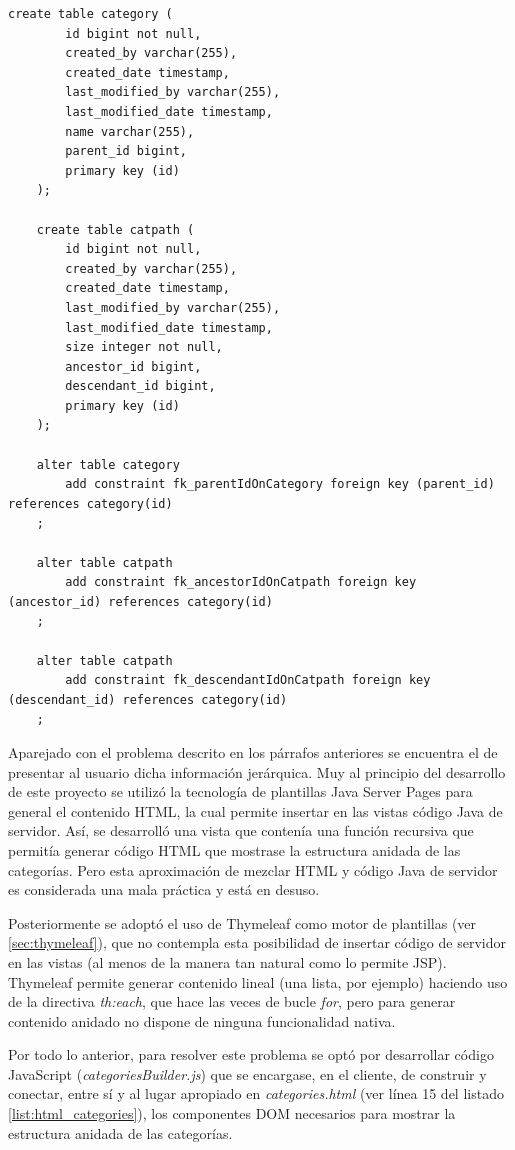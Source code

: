 \documentclass[a4paper]{article}
\begin{document}
    \begin{lstlisting}[caption=Tablas que gestionan las categorías,label=list:sql_cat]
    create table category (
    	id bigint not null, 
    	created_by varchar(255), 
    	created_date timestamp, 
    	last_modified_by varchar(255), 
    	last_modified_date timestamp, 
    	name varchar(255), 
    	parent_id bigint, 
    	primary key (id)
    );
    	
    create table catpath (
    	id bigint not null, 
    	created_by varchar(255), 
    	created_date timestamp, 
    	last_modified_by varchar(255), 
    	last_modified_date timestamp, 
    	size integer not null, 
    	ancestor_id bigint, 
    	descendant_id bigint, 
    	primary key (id)
    );
    
    alter table category 
    	add constraint fk_parentIdOnCategory foreign key (parent_id) references category(id)
    ;
    
    alter table catpath 
    	add constraint fk_ancestorIdOnCatpath foreign key (ancestor_id) references category(id)
    ;
    
    alter table catpath 
    	add constraint fk_descendantIdOnCatpath foreign key (descendant_id) references category(id)
    ;
    \end{lstlisting}
    
    Aparejado con el problema descrito en los párrafos anteriores se encuentra el de presentar al usuario dicha información jerárquica. Muy al principio del desarrollo de este proyecto se utilizó la tecnología de plantillas Java Server Pages para general el contenido HTML, la cual permite insertar en las vistas código Java de servidor. Así, se desarrolló una vista que contenía una función recursiva que permitía generar código HTML que mostrase la estructura anidada de las categorías. Pero esta aproximación de mezclar HTML y código Java de servidor es considerada una mala práctica y está en desuso.
    
    Posteriormente se adoptó el uso de Thymeleaf como motor de plantillas (ver \ref{sec:thymeleaf}), que no contempla esta posibilidad de insertar código de servidor en las vistas (al menos de la manera tan natural como lo permite JSP). Thymeleaf permite generar contenido lineal (una lista, por ejemplo) haciendo uso de la directiva \emph{th:each}, que hace las veces de bucle \emph{for}, pero para generar contenido anidado no dispone de ninguna funcionalidad nativa.
    
    Por todo lo anterior, para resolver este problema se optó por desarrollar código JavaScript (\emph{categoriesBuilder.js}) que se encargase, en el cliente, de construir y conectar, entre sí y al lugar apropiado en \emph{categories.html} (ver línea 15 del listado \ref{list:html_categories}), los componentes DOM necesarios para mostrar la estructura anidada de las categorías.
    \\
    
\end{document}
